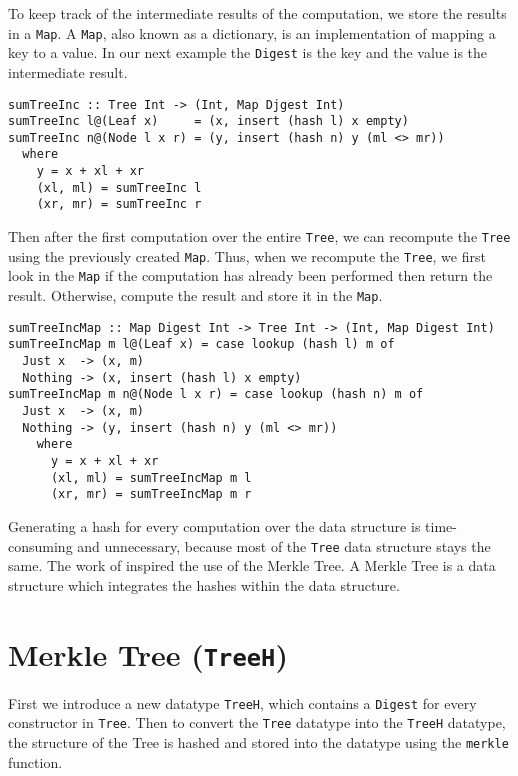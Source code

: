 To keep track of the intermediate results of the computation, we store the results in a \texttt{Map}. A \texttt{Map}, also known as a dictionary, is an implementation of mapping a key to a value. In our next example the \texttt{Digest} is the key and the value is the intermediate result.

\begin{verbatim}
sumTreeInc :: Tree Int -> (Int, Map Djgest Int)
sumTreeInc l@(Leaf x)     = (x, insert (hash l) x empty)
sumTreeInc n@(Node l x r) = (y, insert (hash n) y (ml <> mr))
  where
    y = x + xl + xr
    (xl, ml) = sumTreeInc l
    (xr, mr) = sumTreeInc r
\end{verbatim}

Then after the first computation over the entire \texttt{Tree}, we can recompute the \texttt{Tree} using the previously created \texttt{Map}. Thus, when we recompute the \texttt{Tree}, we first look in the \texttt{Map} if the computation has already been performed then return the result. Otherwise, compute the result and store it in the \texttt{Map}.

\begin{verbatim}
sumTreeIncMap :: Map Digest Int -> Tree Int -> (Int, Map Digest Int)
sumTreeIncMap m l@(Leaf x) = case lookup (hash l) m of
  Just x  -> (x, m) 
  Nothing -> (x, insert (hash l) x empty)
sumTreeIncMap m n@(Node l x r) = case lookup (hash n) m of
  Just x  -> (x, m)
  Nothing -> (y, insert (hash n) y (ml <> mr))
    where
      y = x + xl + xr
      (xl, ml) = sumTreeIncMap m l
      (xr, mr) = sumTreeIncMap m r
\end{verbatim}

Generating a hash for every computation over the data structure is time-consuming and unnecessary, because most of the \texttt{Tree} data structure stays the same. The work of \citeauthor{miraldo2019efficient}\cite{miraldo2019efficient} inspired the use of the Merkle Tree. A Merkle Tree is a data structure which integrates the hashes within the data structure.

\section{Merkle Tree (\texttt{TreeH})}
First we introduce a new datatype \texttt{TreeH}, which contains a \texttt{Digest} for every constructor in \texttt{Tree}. Then to convert the \texttt{Tree} datatype into the \texttt{TreeH} datatype, the structure of the Tree is hashed and stored into the datatype using the \texttt{merkle} function.


